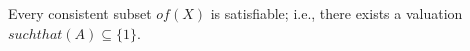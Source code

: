 Every consistent subset $ of (X)$ is satisfiable; i.e., there exists a valuation $ such that (A) \subseteq \{1\}$.
